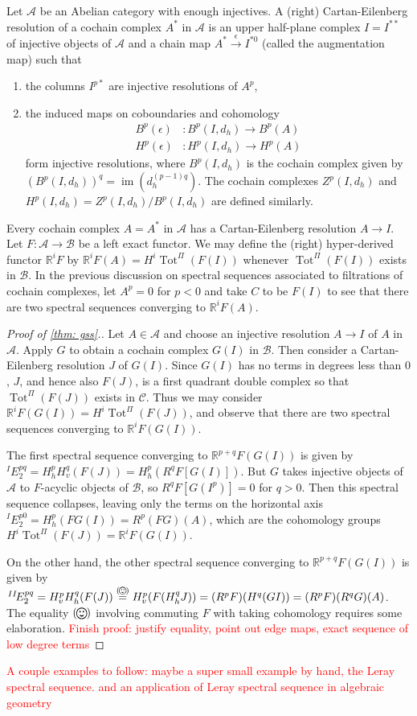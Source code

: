 \documentclass[11pt,leqno]{article}
\newcommand{\sai}[1]{\textcolor{red}{#1}}
\theoremstyle{plain}
\theoremstyle{definition}
\numberwithin{equation}{section}
\numberwithin{lem}{section}
\newcommand{\eq}[1]{\overset{(#1)}{=}}
\DeclareMathOperator{\im}{im}
\DeclareMathOperator{\Tot}{Tot}
\newcommand{\smallhappy}{\raisebox{-.14em}{\smiley}}
\newcommand{\happy}{\raisebox{-.24em}{\resizebox{1.2em}{!}{\smiley}}}
\DeclareMathOperator{\mathhappy}{\!\happy\!}
\DeclareMathOperator{\smallmathhappy}{\!\smallhappy\!}
\begin{document}
Let $\mathcal A$ be an Abelian category with enough injectives. A (right) Cartan-Eilenberg resolution of a cochain complex $A^\ast$ in $\mathcal A$ is an upper half-plane complex $I = I^{\ast\ast}$ of injective objects of $\mathcal A$ and a chain map $A^\ast\xrightarrow{\epsilon} I^{\ast 0}$ (called the augmentation map) such that \begin{enumerate}
  \item the columns $I^{p\ast}$ are injective resolutions of $A^p$,
  \item the induced maps on coboundaries and cohomology 
  \begin{align*}
    B^p(\epsilon)&\colon B^p(I,d_h)\to B^p(A)\\
    H^p(\epsilon)&\colon H^p(I,d_h)\to H^p(A)
  \end{align*}
  form injective resolutions, where $B^p(I,d_h)$ is the cochain complex given by $(B^p(I,d_h))^q = \im(d_h^{(p-1)q})$. The cochain complexes $Z^p(I,d_h)$ and $H^p(I,d_h) = Z^p(I,d_h)/B^p(I,d_h)$ are defined similarly.
\end{enumerate}
Every cochain complex $A = A^\ast$ in $\mathcal A$ has a Cartan-Eilenberg resolution $A\to I$. Let $F\colon\mathcal A\to\mathcal B$ be a left exact functor. We may define the (right) hyper-derived functor $\mathbb R^iF$ by $\mathbb R^iF(A) = H^i\Tot^{\Pi}(F(I))$ whenever $\Tot^{\Pi}(F(I))$ exists in $\mathcal B$. In the previous discussion on spectral sequences associated to filtrations of cochain complexes, let $A^p = 0$ for $p<0$ and take $C$ to be $F(I)$ to see that there are two spectral sequences converging to $\mathbb R^iF(A)$.

\begin{proof}[Proof of \cref{thm: gss}.]
  Let $A\in \mathcal A$ and choose an injective resolution $A\to I$ of $A$ in $\mathcal A$. Apply $G$ to obtain a cochain complex $G(I)$ in $\mathcal B$. Then consider a Cartan-Eilenberg resolution $J$ of $G(I)$. Since $G(I)$ has no terms in degrees less than $0$, $J$, and hence also $F(J)$, is a first quadrant double complex so that $\Tot^\Pi(F(J))$ exists in $\mathcal C$. Thus we may consider $\mathbb R^iF(G(I)) = H^i\Tot^\Pi(F(J))$, and observe that there are two spectral sequences converging to $\mathbb R^iF(G(I))$.

  The first spectral sequence converging to $\mathbb R^{p+q}F(G(I))$ is given by ${}^{I}\!E_2^{pq} = H_h^pH_v^q(F(J)) = H_h^p(R^qF[G(I)])$. But $G$ takes injective objects of $\mathcal A$ to $F$-acyclic objects of $\mathcal B$, so $R^qF[G(I^p)] = 0$ for $q>0$. Then this spectral sequence collapses, leaving only the terms on the horizontal axis ${}^{I}\!E_2^{p0} = H_h^p(FG(I)) = R^p(FG)(A)$, which are the cohomology groups $H^i\Tot^\Pi(F(J)) = \mathbb R^iF(G(I))$.

  On the other hand, the other spectral sequence converging to $\mathbb R^{p+q}F(G(I))$ is given by ${}^{II}\!E_2^{pq} = H_v^pH_h^q(F(J)) \eq{\smallmathhappy} H_v^p(F(H_h^qJ)) = (R^pF)(H^q(GI)) = (R^pF)(R^qG)(A)$. The equality $(\mathhappy)$ involving commuting $F$ with taking cohomology requires some elaboration. \sai{Finish proof: justify equality, point out edge maps, exact sequence of low degree terms}
\end{proof} 

\sai{A couple examples to follow: maybe a super small example by hand, the Leray spectral sequence. and an application of Leray spectral sequence in algebraic geometry}
\end{document}
